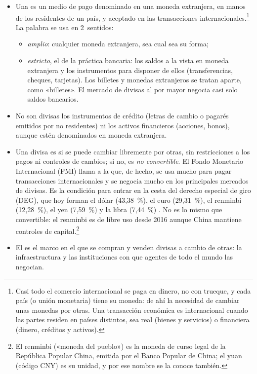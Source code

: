 \documentclass[11pt]{article}
\begin{document}
\begin{itemize}
\item Una  es un medio de pago denominado en una moneda extranjera, en manos de los residentes de un país, y aceptado en las transacciones internacionales.\footnote{Casi todo el comercio internacional se paga en dinero, no con trueque, y cada país (o unión monetaria) tiene su moneda: de ahí la necesidad de cambiar unas monedas por otras. Una transacción económica es internacional cuando las partes residen en países distintos, sea real (bienes y servicios) o financiera (dinero, créditos y activos).} La palabra se usa en 2~sentidos:
  \begin{itemize}
  \item \emph{amplio}: cualquier moneda extranjera, sea cual sea su forma;
  \item \emph{estricto}, el de la práctica bancaria: los saldos a la vista en moneda extranjera y los instrumentos para disponer de ellos (transferencias, cheques, tarjetas). Los billetes y monedas extranjeros se tratan aparte, como «billetes». El mercado de divisas al por mayor negocia casi solo saldos bancarios.
  \end{itemize}
\item No son divisas los instrumentos de crédito (letras de cambio o pagarés emitidos por no residentes) ni los activos financieros (acciones, bonos), aunque estén denominados en moneda extranjera.
\item Una divisa es  si se puede cambiar libremente por otras, sin restricciones a los pagos ni controles de cambios; si no, es \emph{no convertible}. El Fondo Monetario Internacional (FMI) llama  a la que, de hecho, se usa mucho para pagar transacciones internacionales y se negocia mucho en los principales mercados de divisas\nocite{FMIConvenio}. Es la condición para entrar en la cesta del derecho especial de giro (DEG), que hoy forman el dólar (43,38~\%), el euro (29,31~\%), el renminbi (12,28~\%), el yen (7,59~\%) y la libra (7,44~\%)\nocite{FMI2022DEG} . No es lo mismo que convertible: el renminbi es de libre uso desde 2016 aunque China mantiene controles de capital.\footnote{El renminbi («moneda del pueblo») es la moneda de curso legal de la República Popular China, emitida por el Banco Popular de China; el yuan (código CNY) es su unidad, y por ese nombre se la conoce también.}
\item El  es el marco en el que se compran y venden divisas a cambio de otras: la infraestructura y las instituciones con que agentes de todo el mundo las negocian.

\end{itemize}
\end{document}
